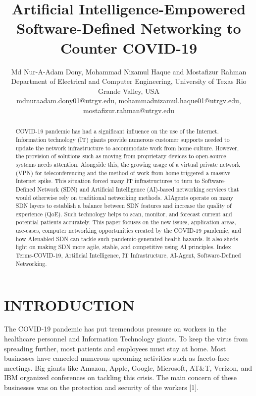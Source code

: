 \documentclass[10pt]{article}
\title{Artificial Intelligence-Empowered Software-Defined Networking to Counter COVID-19 }
\author{Md Nur-A-Adam Dony, Mohammad Nizamul Haque and Mostafizur Rahman\\
Department of Electrical and Computer Engineering, University of Texas Rio Grande Valley, USA\\
mdnuraadam.dony01@utrgv.edu, mohammadnizamul.haque01@utrgv.edu, mostafizur.rahman@utrgv.edu}
\date{}
\begin{document}
\maketitle


\begin{abstract}
COVID-19 pandemic has had a significant influence on the use of the Internet. Information technology (IT) giants provide numerous customer supports needed to update the network infrastructure to accommodate work from home culture. However, the provision of solutions such as moving from proprietary devices to open-source systems needs attention. Alongside this, the growing usage of a virtual private network (VPN) for teleconferencing and the method of work from home triggered a massive Internet spike. This situation forced many IT infrastructures to turn to Software-Defined Network (SDN) and Artificial Intelligence (AI)-based networking services that would otherwise rely on traditional networking methods. AIAgents operate on many SDN layers to establish a balance between SDN features and increase the quality of experience (QoE). Such technology helps to scan, monitor, and forecast current and potential patients accurately. This paper focuses on the new issues, application areas, use-cases, computer networking opportunities created by the COVID-19 pandemic, and how AIenabled SDN can tackle such pandemic-generated health hazards. It also sheds light on making SDN more agile, stable, and competitive using AI principles.
Index Terms-COVID-19, Artificial Intelligence, IT Infrastructure, AI-Agent, Software-Defined Networking.
\end{abstract}

\section{INTRODUCTION}
The COVID-19 pandemic has put tremendous pressure on workers in the healthcare personnel and Information Technology giants. To keep the virus from spreading further, most patients and employees must stay at home. Most businesses have canceled numerous upcoming activities such as faceto-face meetings. Big giants like Amazon, Apple, Google, Microsoft, AT\&T, Verizon, and IBM organized conferences on tackling this crisis. The main concern of these businesses was on the protection and security of the workers [1].
\end{document}
